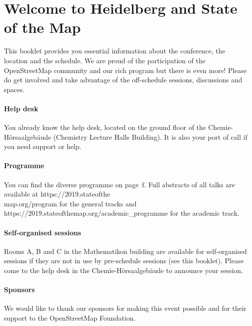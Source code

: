 \newpage
\enlargethispage{1\baselineskip}
\section*{Welcome to Heidelberg and State of the Map } \label{welcome}
This booklet provides you essential information
about the conference, the location and the schedule.  We are proud of the participation of the
OpenStreetMap community and our rich program but there is even more!  Please do get involved and
take advantage of the off-schedule sessions, discussions and spaces.

\paragraph*{Help desk} \label{welcome-helpdesk}
You already know the help desk, located on the ground floor of the Chemie-Hörsaalgebäude (Chemistry
Lecture Halls Building). It is also your port of call if you need support or help.

\paragraph*{Programme}
You can find the diverse programme on page~\pageref{saturday}f. Full abstracts of all talks are
available at https://2019.stateofthe\\map.org/program for the general tracks and
https://2019.stateofthemap.org/academic\_programme for the academic track.

\paragraph*{Self-organised sessions} \label{welcome-location}
Rooms A, B and C in the Mathematikon building are available for self-organised sessions if they are not in use by pre-schedule sessions (see this booklet). Please come to the help desk in the Chemie-Hörsaalgebäude to announce your session.

\paragraph*{Sponsors} \label{welcome-sponsors}
We would like to thank our sponsors for making this event possible and for their support to the
OpenStreetMap Foundation.
\newpage

